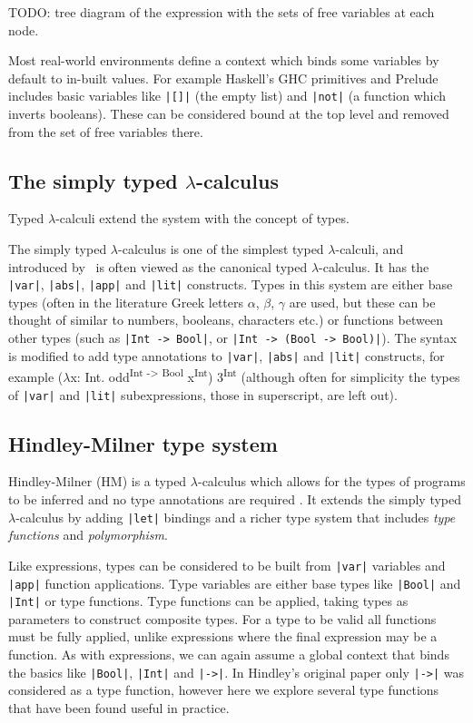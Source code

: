 \documentclass[a4paper,fleqn,12pt]{article}
\begin{document}
TODO: tree diagram of the expression with the sets of free variables at each node.

Most real-world environments define a context which binds some variables by default to in-built values. For example Haskell’s GHC primitives and Prelude includes basic variables like \texttt{|[]|} (the empty list) and \texttt{|not|} (a function which inverts booleans). These can be considered bound at the top level and removed from the set of free variables there.
\subsection{The simply typed $\lambda$-calculus}\label{id:h.w7vj0r89b86n}
Typed $\lambda$-calculi extend the system with the concept of types.

The simply typed $\lambda$-calculus is one of the simplest typed $\lambda$-calculi, and introduced by~\cite{ref10} is often viewed as the canonical typed $\lambda$-calculus. It has the \texttt{|var|}, \texttt{|abs|}, \texttt{|app|} and \texttt{|lit|} constructs. Types in this system are either base types (often in the literature Greek letters $\alpha$, $\beta$, $\gamma$ are used, but these can be thought of similar to numbers, booleans, characters etc.) or functions between other types (such as \texttt{|Int -> Bool|}, or \texttt{|Int -> (Bool -> Bool)|}). The syntax is modified to add type annotations to \texttt{|var|}, \texttt{|abs|} and \texttt{|lit|} constructs, for example ($\lambda$x: Int. odd\textsuperscript{Int -> Bool} x\textsuperscript{Int}) 3\textsuperscript{Int} (although often for simplicity the types of \texttt{|var|} and \texttt{|lit|} subexpressions, those in superscript, are left out).
\subsection{Hindley-Milner type system}\label{id:h.gsouq2axz3k}
Hindley-Milner (HM) is a typed $\lambda$-calculus which allows for the types of programs to be inferred and no type annotations are required \citep{ref11,ref12}. It extends the simply typed $\lambda$-calculus by adding \texttt{|let|} bindings and a richer type system that includes \textit{type functions} and \textit{polymorphism}.

Like expressions, types can be considered to be built from \texttt{|var|} variables and \texttt{|app|} function applications. Type variables are either base types like \texttt{|Bool|} and \texttt{|Int|} or type functions. Type functions can be applied, taking types as parameters to construct composite types. For a type to be valid all functions must be fully applied, unlike expressions where the final expression may be a function.  As with expressions, we can again assume a global context that binds the basics like \texttt{|Bool|}, \texttt{|Int|} and \texttt{|->|}. In Hindley’s original paper only \texttt{|->|} was considered as a type function, however here we explore several type functions that have been found useful in practice.
\end{document}
